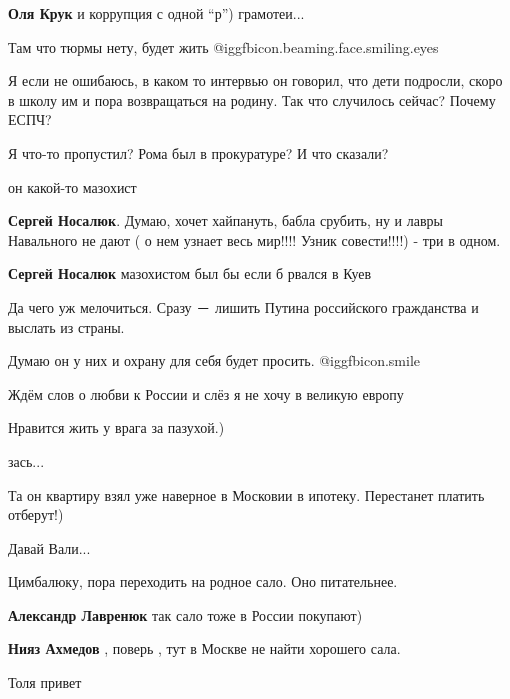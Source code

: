 \begin{itemize}
\begin{itemize}
\textbf{Оля Крук} и коррупция с одной \enquote{р}) грамотеи...

\end{itemize} %

Там что тюрмы нету, будет жить @igg{fbicon.beaming.face.smiling.eyes} 


Я если не ошибаюсь, в каком то интервью он говорил, что дети подросли, скоро в
школу им и пора возвращаться на родину. Так что случилось сейчас? Почему ЕСПЧ?


Я что-то пропустил? Рома был в прокуратуре? И что сказали?

он какой-то мазохист

\begin{itemize} %
\textbf{Сергей Носалюк}.
Думаю, хочет хайпануть, бабла срубить, ну и лавры Навального не дают ( о нем узнает весь мир!!!! Узник совести!!!!) - три в одном.

\textbf{Сергей Носалюк} мазохистом был бы если б рвался в Куев
\end{itemize} %

Да чего уж мелочиться. Сразу － лишить Путина российского гражданства и выслать из страны.

Думаю он у них и охрану для себя будет просить.  @igg{fbicon.smile} 

Ждём слов о любви к России и слёз я не хочу в великую европу

Нравится жить у врага за пазухой.)

зась...

Та он квартиру взял уже наверное в Московии в ипотеку. Перестанет платить отберут!)

Давай Вали...

Цимбалюку, пора переходить на родное сало. Оно питательнее.

\begin{itemize} %
\textbf{Александр Лавренюк} так сало тоже в России покупают)

\textbf{Нияз Ахмедов} , поверь , тут в Москве не найти хорошего сала.
\end{itemize} %

Толя привет


\end{itemize}
